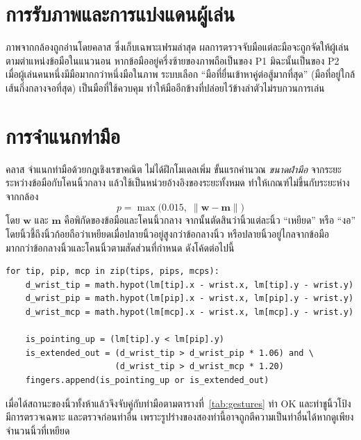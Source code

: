 \documentclass[12pt,a4paper]{report}
\newcommand{\code}[1]{\texttt{\detokenize{#1}}}
\begin{document}
\section{การรับภาพและการแบ่งแดนผู้เล่น}
ภาพจากกล้องถูกอ่านโดยคลาส \code{CameraStream} ซึ่งเก็บเฉพาะเฟรมล่าสุด ผลการตรวจจับมือแต่ละมือจะถูกจัดให้ผู้เล่น
ตามตำแหน่งข้อมือในแนวนอน หากข้อมืออยู่ครึ่งซ้ายของภาพถือเป็นของ P1 มิฉะนั้นเป็นของ P2
เมื่อผู้เล่นคนหนึ่งมีมือมากกว่าหนึ่งมือในภาพ ระบบเลือก ``มือที่ยื่นเข้าหาคู่ต่อสู้มากที่สุด''
(มือที่อยู่ใกล้เส้นกึ่งกลางจอที่สุด) เป็นมือที่ใช้ควบคุม ทำให้มืออีกข้างที่ปล่อยไว้ข้างลำตัวไม่รบกวนการเล่น

\section{การจำแนกท่ามือ}
คลาส \code{GestureRecognizer} จำแนกท่ามือด้วยกฎเชิงเรขาคณิต ไม่ได้ฝึกโมเดลเพิ่ม ขั้นแรกคำนวณ \textit{ขนาดฝ่ามือ}
จากระยะระหว่างข้อมือกับโคนนิ้วกลาง แล้วใช้เป็นหน่วยอ้างอิงของระยะทั้งหมด ทำให้เกณฑ์ไม่ขึ้นกับระยะห่างจากกล้อง
\begin{equation}
  p = \max\bigl(0.015,\; \lVert \mathbf{w} - \mathbf{m} \rVert \bigr)
\end{equation}
โดย $\mathbf{w}$ และ $\mathbf{m}$ คือพิกัดของข้อมือและโคนนิ้วกลาง จากนั้นตัดสินว่านิ้วแต่ละนิ้ว ``เหยียด'' หรือ ``งอ''
โดยนิ้วชี้ถึงนิ้วก้อยถือว่าเหยียดเมื่อปลายนิ้วอยู่สูงกว่าข้อกลางนิ้ว หรือปลายนิ้วอยู่ไกลจากข้อมือมากกว่าข้อกลางนิ้วและโคนนิ้วตามสัดส่วนที่กำหนด
ดังโค้ดต่อไปนี้

\begin{lstlisting}[caption={การตัดสินสถานะนิ้วชี้ถึงนิ้วก้อย (ย่อจาก gesture\_recognizer.py)}, label={lst:finger}]
for tip, pip, mcp in zip(tips, pips, mcps):
    d_wrist_tip = math.hypot(lm[tip].x - wrist.x, lm[tip].y - wrist.y)
    d_wrist_pip = math.hypot(lm[pip].x - wrist.x, lm[pip].y - wrist.y)
    d_wrist_mcp = math.hypot(lm[mcp].x - wrist.x, lm[mcp].y - wrist.y)

    is_pointing_up = (lm[tip].y < lm[pip].y)
    is_extended_out = (d_wrist_tip > d_wrist_pip * 1.06) and \
                      (d_wrist_tip > d_wrist_mcp * 1.20)
    fingers.append(is_pointing_up or is_extended_out)
\end{lstlisting}

เมื่อได้สถานะของนิ้วทั้งห้าแล้วจึงจับคู่กับท่ามือตามตารางที่~\ref{tab:gestures} ท่า OK และท่าชูนิ้วโป้งมีการตรวจเฉพาะ
และตรวจก่อนท่าอื่น เพราะรูปร่างของสองท่านี้อาจถูกตีความเป็นท่าอื่นได้หากดูเพียงจำนวนนิ้วที่เหยียด
\end{document}
